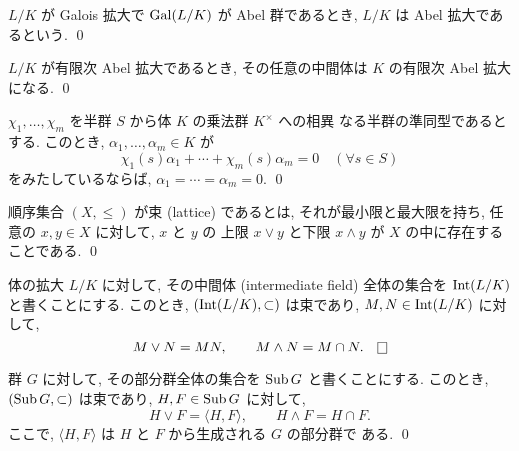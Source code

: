 \documentclass[12pt,twoside]{jarticle}
\begin{document}
\begin{definition}[Abel 拡大]
  $L/K$ が Galois 拡大で $\mathop{\mathrm{Gal}}\nolimits(L/K)$ が Abel 群であるとき,
  $L/K$ は Abel 拡大であるという. \qed
\end{definition}

\begin{question}
  $L/K$ が有限次 Abel 拡大であるとき, その任意の中間体は $K$ の有限次 Abel 
  拡大になる. \qed
\end{question}

\begin{question}[E.~Artin]
  $\chi_1,\ldots,\chi_m$ を半群 $S$ から体 $K$ の乗法群 $K^\times$ への相異
  なる半群の準同型であるとする.  このとき, $\alpha_1,\ldots,\alpha_m\in K$ 
  が
  \begin{equation*}
    \chi_1(s)\alpha_1 + \cdots + \chi_m(s)\alpha_m = 0
    \quad (\forall s\in S)
  \end{equation*}
  をみたしているならば, $\alpha_1=\cdots=\alpha_m=0$. \qed
\end{question}

\begin{definition}[束 (lattice)]
  順序集合 $(X,\le)$ が束 (lattice) であるとは, それが最小限と最大限を持ち, 
  任意の $x,y\in X$ に対して, $x$ と $y$ の
  上限 $x\vee y$ と下限 $x\wedge y$ が $X$ の中に存在することである. 
  \qed
\end{definition}

\begin{question}
  体の拡大 $L/K$ に対して, その中間体 (intermediate field) 
  全体の集合を $\mathop{\mathrm{Int}}\nolimits(L/K)$ と書くことにする. 
  このとき, $(\mathop{\mathrm{Int}}\nolimits(L/K),\subset)$ は束であり, $M,N\in\mathop{\mathrm{Int}}\nolimits(L/K)$ に対して,
  \begin{equation*}
    M\vee N = MN, \qquad M\wedge N = M\cap N.  \qed
  \end{equation*}
\end{question}

\begin{question}
  群 $G$ に対して, その部分群全体の集合を $\mathop{\mathrm{Sub}}\nolimits G$ と書くことにする.
  このとき, $(\mathop{\mathrm{Sub}}\nolimits G,\subset)$ は束であり, $H,F\in\mathop{\mathrm{Sub}}\nolimits G$ に対して,
  \begin{equation*}
    H\vee F = \langle H,F \rangle, \qquad H\wedge F = H\cap F. 
  \end{equation*}
  ここで, $\langle H,F \rangle$ は $H$ と $F$ から生成される $G$ の部分群で
  ある. 
  \qed
\end{question}
\end{document}
